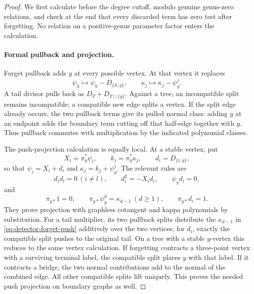 \begin{proof}
We first calculate before the degree cutoff, modulo genuine
genus-zero relations, and check at the end that every discarded
term has zero test after forgetting.  No relation on a
positive-genus parameter factor enters the calculation.

\paragraph{Formal pullback and projection.}
Forget pullback adds
\(y\) at every possible vertex.  At that vertex it replaces
\begin{equation}
 \psi_h\longmapsto\psi_h-D_{\{h,y\}},
 \qquad
 \kappa_j\longmapsto\kappa_j-\psi_y^j.
 \label{eq:detector-vertex-pull}
\end{equation}
A tail divisor pulls back as \(D_T+D_{T\cup\{y\}}\).
Against a tree, an incompatible split remains incompatible;
a compatible new edge splits a vertex.  If the split edge
already occurs, the two pullback terms give its pulled normal
class: adding \(y\) at an endpoint adds the boundary term
cutting off that half-edge together with \(y\).  Thus pullback
commutes with multiplication by the indicated polynomial
classes.

The push-projection calculation is equally local.  At a stable
vertex, put
\[
 X_i=\pi_y^*\psi_i,\qquad k_j=\pi_y^*\kappa_j,\qquad
 d_i=D_{\{i,y\}},
\]
so that \(\psi_i=X_i+d_i\) and
\(\kappa_j=k_j+\psi_y^j\).  The relevant rules are
\begin{equation}
 d_i d_l=0\ (i\neq l),\qquad
 d_i^2=-X_i d_i,\qquad
 \psi_y d_i=0,
 \label{eq:detector-forget-products}
\end{equation}
and
\begin{equation}
 \pi_{y*}1=0,\qquad
 \pi_{y*}\psi_y^d=\kappa_{d-1}\ (d\geq1),\qquad
 \pi_{y*}d_i=1.
 \label{eq:detector-forget-push}
\end{equation}
They prove projection with graphless cotangent and kappa
polynomials by substitution.  For a tail multiplier, its two
pullback splits distribute the \(\kappa_{d-1}\) in \eqref{eq:detector-forget-push}
additively over the two vertices; for \(d_i\), exactly the
compatible split pushes to the original tail.  On a tree with
a stable \(y\)-vertex this reduces to the same vertex
calculation.  If forgetting contracts a three-point vertex
with a surviving terminal label, the compatible split places
\(y\) with that label.  If it contracts a bridge, the two
normal contributions add to the normal of the combined edge.
All other compatible splits lift uniquely.  This proves the
needed push projection on boundary graphs as well.


\end{proof}

